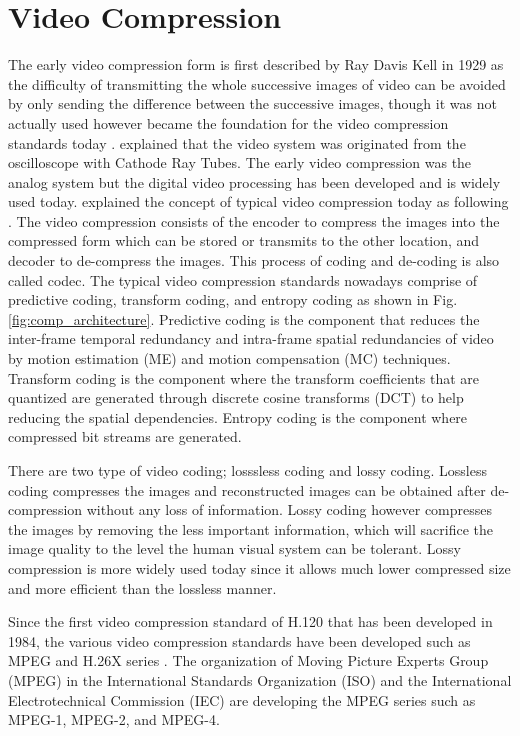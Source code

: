 \section{Video Compression}
\label{sec:introduction/section_b}

The early video compression form is first described by Ray Davis Kell in 1929 as the difficulty of transmitting the whole successive images of video can be avoided by only sending the difference between the successive images, though it was not actually used however became the foundation for the video compression standards today \cite{jacobs_brief_2009}. \citeauthor{jacobs_brief_2009} explained that the video system was originated from the oscilloscope with Cathode Ray Tubes. The early video compression was the analog system but the digital video processing has been developed and is widely used today. \citeauthor{zhang_overview_2019} explained the concept of typical video compression today as following \cite{zhang_overview_2019}. The video compression consists of the encoder to compress the images into the compressed form which can be stored or transmits to the other location, and decoder to de-compress the images. This process of coding and de-coding is also called codec. The typical video compression standards nowadays comprise of predictive coding, transform coding, and entropy coding as shown in Fig. \ref{fig:comp_architecture}. Predictive coding is the component that reduces the inter-frame temporal redundancy and intra-frame spatial redundancies of video by motion estimation (ME) and motion compensation (MC) techniques. Transform coding is the component where the transform coefficients that are quantized are generated through discrete cosine transforms (DCT) to help reducing the spatial dependencies. Entropy coding is the component where compressed bit streams are generated.



There are two type of video coding; losssless coding and lossy coding. Lossless coding compresses the images and reconstructed images can be obtained after de-compression without any loss of information. Lossy coding however compresses the images by removing the less important information, which will sacrifice the image quality to the level the human visual system can be tolerant. Lossy compression is more widely used today since it allows much lower compressed size and more efficient than the lossless manner.

Since the first video compression standard of H.120 that has been developed in 1984, the various video compression standards have been developed such as MPEG and H.26X series \cite{zhang_overview_2019}. The organization of Moving Picture Experts Group (MPEG) in the International Standards Organization (ISO) and the International Electrotechnical Commission (IEC) are developing the MPEG series such as MPEG-1, MPEG-2, and MPEG-4.

